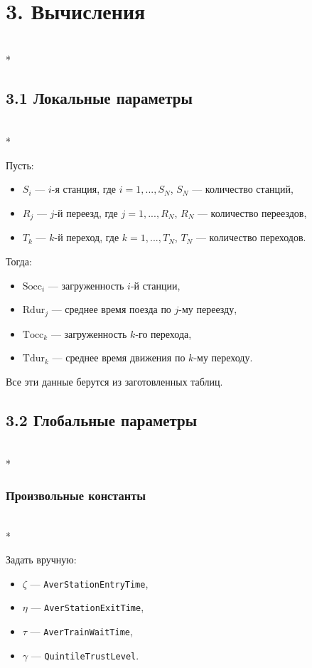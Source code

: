 \documentclass[12pt]{article}
\begin{document}
\section*{3. Вычисления}\mbox{}\\*

\subsection*{3.1 Локальные параметры}\mbox{}\\*

Пусть:

\begin{itemize}
  \item $S_i$ — $i$-я станция, где $i = 1, ..., S_N$, $S_N$ — количество станций,
  \item $R_j$ — $j$-й переезд, где $j = 1, ..., R_N$, $R_N$ — количество переездов,
  \item $T_k$ — $k$-й переход, где $k = 1, ..., T_N$, $T_N$ — количество переходов.
\end{itemize}

Тогда:

\begin{itemize}
  \item $\text{Socc}_i$ — загруженность $i$-й станции,
  \item $\text{Rdur}_j$ — среднее время поезда по $j$-му переезду,
  \item $\text{Tocc}_k$ — загруженность $k$-го перехода,
  \item $\text{Tdur}_k$ — среднее время движения по $k$-му переходу.
\end{itemize}

Все эти данные берутся из заготовленных таблиц.

\subsection*{3.2 Глобальные параметры}\mbox{}\\*

\subsubsection*{Произвольные константы}\mbox{}\\*

Задать вручную:

\begin{itemize}
  \item $\zeta$ --- \texttt{AverStationEntryTime},
  \item $\eta$ --- \texttt{AverStationExitTime},
  \item $\tau$ --- \texttt{AverTrainWaitTime},
  \item $\gamma$ --- \texttt{QuintileTrustLevel}.
\end{itemize}
\end{document}
